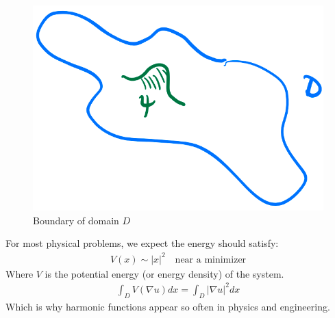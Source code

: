 \begin{proposition}
    \begin{figure}[H]
        \centering
        \includegraphics[scale=0.5]{LECTURE_20/boundary.png}
        \caption{Boundary of domain $D$}
    \end{figure}

    For most physical problems, we expect the energy should satisfy:
    \begin{align*}
        V(x) \sim |x|^2 \quad \text{near a minimizer}
    \end{align*}
    Where $V$ is the potential energy (or energy density) of the system.
    \begin{align*}
        \int_D V(\nabla u) dx = \int_D |\nabla u|^2 dx
    \end{align*}
    Which is why harmonic functions appear so often in physics and engineering.
\end{proposition}